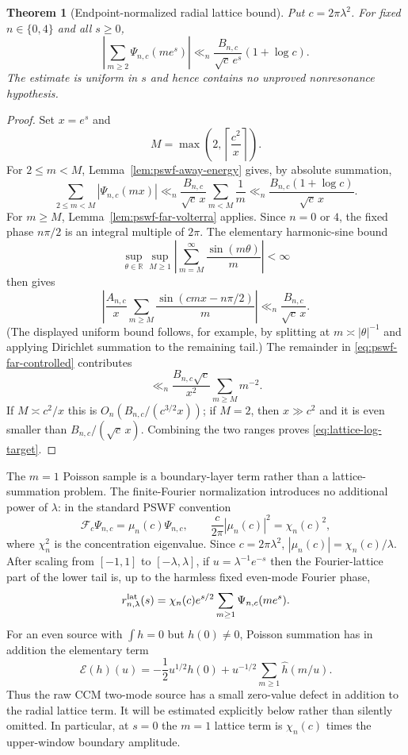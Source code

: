\documentclass[11pt]{article}
\newtheorem{theorem}{Theorem}[section]
\theoremstyle{remark}
\begin{document}
\begin{theorem}[Endpoint-normalized radial lattice bound]\label{thm:lattice-tail}
Put $c=2\pi\lambda^2$.  For fixed $n\in\{0,4\}$ and all $s\ge0$,
\begin{equation}\label{eq:lattice-log-target}
 \boxed{
 \left|\sum_{m\ge2}\Psi_{n,c}(me^s)\right|
 \ll_n
 \frac{B_{n,c}}{\sqrt c\,e^s}(1+\log c).}
\end{equation}
The estimate is uniform in $s$ and hence contains no unproved nonresonance hypothesis.
\end{theorem}
\begin{proof}
Set $x=e^s$ and
\[
 M=\max\!\left(2,\left\lceil\frac{c^2}{x}\right\rceil\right).
\]
For $2\le m<M$, Lemma~\ref{lem:pswf-away-energy} gives, by absolute summation,
\[
 \sum_{2\le m<M}|\Psi_{n,c}(mx)|
 \ll_n\frac{B_{n,c}}{\sqrt c\,x}\sum_{m<M}\frac1m
 \ll_n\frac{B_{n,c}(1+\log c)}{\sqrt c\,x}.
\]
For $m\ge M$, Lemma~\ref{lem:pswf-far-volterra} applies.  Since $n=0$ or $4$, the fixed phase $n\pi/2$ is an integral multiple of $2\pi$.  The elementary harmonic-sine bound
\[
 \sup_{\theta\in\mathbb R}\sup_{M\ge1}
 \left|\sum_{m=M}^{\infty}\frac{\sin(m\theta)}m\right|<\infty
\]
then gives
\[
 \left|\frac{A_{n,c}}x\sum_{m\ge M}\frac{\sin(cmx-n\pi/2)}m\right|
 \ll_n\frac{B_{n,c}}{\sqrt c\,x}.
\]
(The displayed uniform bound follows, for example, by splitting at $m\asymp |\theta|^{-1}$ and applying Dirichlet summation to the remaining tail.)
The remainder in \eqref{eq:pswf-far-controlled} contributes
\[
 \ll_n\frac{B_{n,c}\sqrt c}{x^2}\sum_{m\ge M}m^{-2}.
\]
If $M\asymp c^2/x$ this is $O_n(B_{n,c}/(c^{3/2}x))$; if $M=2$, then $x\gg c^2$ and it is even smaller than $B_{n,c}/(\sqrt c\,x)$.  Combining the two ranges proves \eqref{eq:lattice-log-target}.
\end{proof}

The $m=1$ Poisson sample is a boundary-layer term rather than a lattice-summation problem.  The finite-Fourier normalization introduces no additional power of $\lambda$: in the standard PSWF convention
\[
 \mathcal F_c\Psi_{n,c}=\mu_n(c)\Psi_{n,c},\qquad
 \frac{c}{2\pi}|\mu_n(c)|^2=\chi_n(c)^2,
\]
where $\chi_n^2$ is the concentration eigenvalue.  Since $c=2\pi\lambda^2$,
$|\mu_n(c)|=\chi_n(c)/\lambda$.  After scaling from $[-1,1]$ to
$[-\lambda,\lambda]$, if $u=\lambda^{-1}e^{-s}$ then the Fourier-lattice part of the lower tail is, up to the harmless fixed even-mode Fourier phase,
\begin{equation}\label{eq:scaled-poisson-radial}
 r_{n,\lambda}^{\rm lat}(s)
 =\chi_n(c)e^{s/2}\sum_{m\ge1}\Psi_{n,c}(me^s).
\end{equation}
For an even source with $\int h=0$ but $h(0)\ne0$, Poisson summation has in addition the elementary term
\begin{equation}\label{eq:poisson-zero-defect}
 \mathcal E(h)(u)
 =-\frac12u^{1/2}h(0)
   +u^{-1/2}\sum_{m\ge1}\widehat h(m/u).
\end{equation}
Thus the raw CCM two-mode source has a small zero-value defect in addition to the radial lattice term.  It will be estimated explicitly below rather than silently omitted.  In particular, at $s=0$ the $m=1$ lattice term is $\chi_n(c)$ times the upper-window boundary amplitude.
\end{document}
